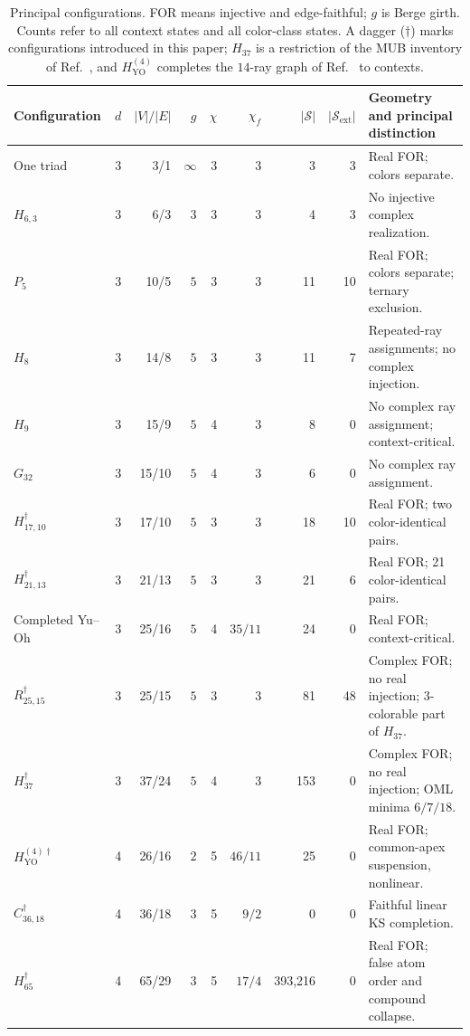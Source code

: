 \documentclass[aps,pra,reprint,superscriptaddress,longbibliography,nofootinbib,floatfix,10pt]{revtex4-2}
\theoremstyle{definition}\newtheorem{definition}[theorem]{Definition}
\theoremstyle{remark}\newtheorem{remark}[theorem]{Remark}
\newcommand{\Sc}{\mathcal S}\newcommand{\Cc}{\mathcal C}
\newcommand{\YO}{\mathrm{YO}}\newcommand{\ip}[2]{\langle #1,#2\rangle}
\begin{document}
\begin{table}[t]
\centering\small\setlength{\tabcolsep}{3pt}
\caption{Principal configurations. FOR means injective and edge-faithful; $g$ is Berge girth. Counts refer to all context states and all color-class states. A dagger ($\dagger$) marks configurations introduced in this paper; $H_{37}$ is a restriction of the MUB inventory of Ref.~\cite{svozil-2025-MYOCHS}, and $H_{\YO}^{(4)}$ completes the $14$-ray graph of Ref.~\cite[Thm.~1]{cabello2015sic} to contexts.}\label{tab:joint-comparison}
\begin{tabular}{p{}rrrrrrrp{}}\toprule
Configuration & $d$ & $|V|/|E|$ & $g$ & $\chi$ & $\chi_f$ & $|\Sc|$ & $|\Sc_{\mathrm{ext}}|$ & Geometry and principal distinction\\\midrule
One triad & 3 & 3/1 & $\infty$ & 3 & $3$ & 3 & 3 & Real FOR; colors separate.\\
$H_{6,3}$ & 3 & 6/3 & $3$ & 3 & $3$ & 4 & 3 & No injective complex realization.\\
$P_5$ & 3 & 10/5 & $5$ & 3 & $3$ & 11 & 10 & Real FOR; colors separate; ternary exclusion.\\
$H_8$ & 3 & 14/8 & $5$ & 3 & $3$ & 11 & 7 & Repeated-ray assignments; no complex injection.\\
$H_9$ & 3 & 15/9 & $5$ & 4 & $3$ & 8 & 0 & No complex ray assignment; context-critical.\\
$G_{32}$ & 3 & 15/10 & $5$ & 4 & $3$ & 6 & 0 & No complex ray assignment.\\
$H_{17,10}^{\dagger}$ & 3 & 17/10 & $5$ & 3 & $3$ & 18 & 10 & Real FOR; two color-identical pairs.\\
$H_{21,13}^{\dagger}$ & 3 & 21/13 & $5$ & 3 & $3$ & 21 & 6 & Real FOR; 21 color-identical pairs.\\
Completed Yu--Oh & 3 & 25/16 & $5$ & 4 & $35/11$ & 24 & 0 & Real FOR; context-critical.\\
$R_{25,15}^{\dagger}$ & 3 & 25/15 & $5$ & 3 & $3$ & 81 & 48 & Complex FOR; no real injection; $3$-colorable part of $H_{37}$.\\
$H_{37}^{\dagger}$ & 3 & 37/24 & $5$ & 4 & $3$ & 153 & 0 & Complex FOR; no real injection; OML minima $6/7/18$.\\
$H_{\YO}^{(4)\dagger}$ & 4 & 26/16 & $2$ & 5 & $46/11$ & 25 & 0 & Real FOR; common-apex suspension, nonlinear.\\
$C_{36,18}^{\dagger}$ & 4 & 36/18 & $3$ & 5 & $9/2$ & 0 & 0 & Faithful linear KS completion.\\
$H_{65}^{\dagger}$ & 4 & 65/29 & $3$ & 5 & $17/4$ & 393,216 & 0 & Real FOR; false atom order and compound collapse.\\
\bottomrule\end{tabular}
\end{table}
\end{document}
